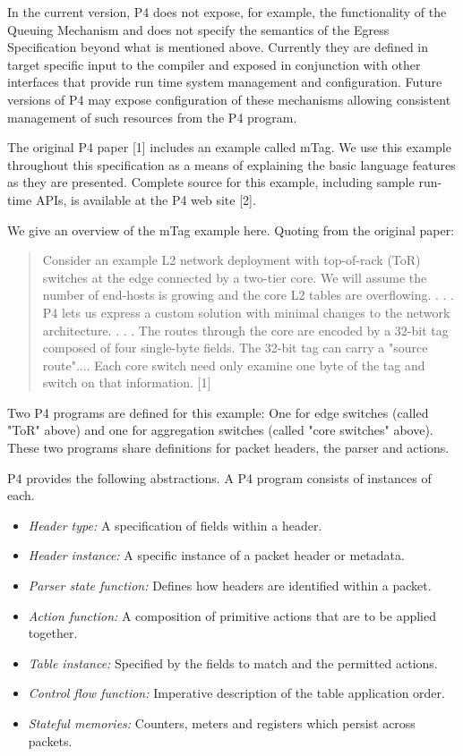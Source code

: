 \documentclass[12pt]{article}
\begin{document}
In the current version, P4 does not expose, for example, the functionality 
of the Queuing Mechanism and does not specify the semantics of the Egress 
Specification beyond what is mentioned above. Currently they are defined in 
target specific input to the compiler and exposed in conjunction with other 
interfaces that provide run time system management and configuration. Future 
versions of P4 may expose configuration of these mechanisms allowing consistent 
management of such resources from the P4 program.


The original P4 paper [1] includes an example called mTag. We use this example 
throughout this specification as a means of explaining the basic language 
features as they are presented. Complete source for this example, including 
sample run-time APIs, is available at the P4 web site [2].

We give an overview of the mTag example here.  Quoting from the original paper:

\begin{quote}
Consider an example L2 network deployment with top-of-rack (ToR) switches 
at the edge connected by a two-tier core. We will assume the number of end-hosts 
is growing and the core L2 tables are overflowing. . . .  P4 lets us express a 
custom solution with minimal changes to the network architecture. . . . The routes 
through the core are encoded by a 32-bit tag composed of four single-byte 
fields.  The 32-bit tag can carry a "source route".... Each core switch need 
only examine one byte of the tag and switch on that information. [1]
\end{quote}

Two P4 programs are defined for this example: One for edge switches (called 
"ToR" above) and one for aggregation switches (called "core switches" above). 
These two programs share definitions for packet headers, the parser and actions.


P4 provides the following abstractions. A P4 program consists of instances 
of each.

\begin{itemize}
\item
\textit{Header type:} A specification of fields within a header.
\item
\textit{Header instance:} A specific instance of a packet header or metadata.
\item
\textit{Parser state function:} Defines how headers are identified
within a packet.
\item
\textit{Action function:} A composition of primitive actions that are to be applied 
together.
\item
\textit{Table instance:} Specified by the fields to match and the permitted actions.
\item
\textit{Control flow function:} Imperative description of the table application order. 
\item
\textit{Stateful memories:} Counters, meters and registers which persist across packets.
\end{itemize}
\end{document}
